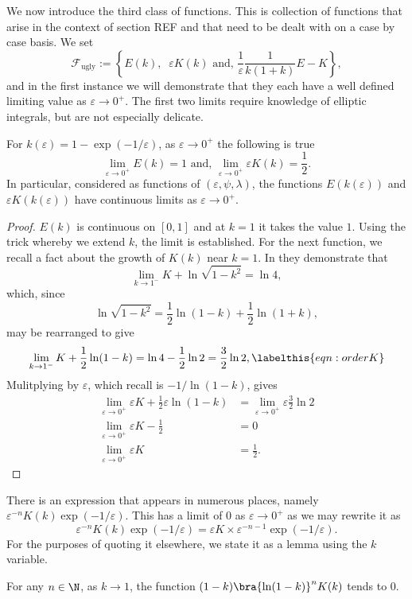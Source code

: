We now introduce the third class of functions. This is collection of functions that arise in the context of section REF  and that need to be dealt with on a case by case basis. We set
\[
\mathcal{F}_\text{ugly} := \left\{ E(k),\;\; εK(k) \text{ and, } \frac{1}{ε}\frac{1}{k(1+k)} E - K \right\},
\]
and in the first instance we will demonstrate that they each have a well defined limiting value as $ε\to 0^+$. The first two limits require knowledge of elliptic integrals, but are not especially delicate.
\begin{lem}\label{lem:limit_ugly_1}
For $k(ε) = 1 - \exp(-1/ε)$, as $ε\to 0^+$ the following is true
\[
\lim_{ε\to 0^+} E(k) = 1 \text{ and, } \lim_{ε\to 0^+} εK(k) = \frac{1}{2}.
\]
In particular, considered as functions of $(ε,ψ,λ)$, the functions $E(k(ε))$ and $εK(k(ε))$ have continuous limits as $ε \to 0^+$.

\begin{proof}
$E(k)$ is continuous on $[0,1]$ and at $k=1$ it takes the value $1$. Using the trick whereby we extend $k$, the limit is established. For the next function, we recall a fact about the growth of $K(k)$ near $k=1$. In \cite{Anderson} they demonstrate that
\[
\lim_{k \to 1^-} K + \ln\sqrt{1-k^2} = \ln 4,
\]
which, since
\[
\ln\sqrt{1-k^2} = \frac{1}{2}\ln(1-k) + \frac{1}{2}\ln(1+k),
\]
may be rearranged to give
\[
\lim_{k \to 1^-} K + \frac{1}{2}\ln(1-k) = \ln 4 - \frac{1}{2}\ln 2 = \frac{3}{2}\ln 2, \labelthis{eqn:order K}
\]
Mulitplying by $ε$, which recall is $-1/\ln(1-k)$, gives
\begin{align*}
\lim_{ε \to 0^+} εK + \frac{1}{2}ε\ln(1-k) &= \lim_{ε \to 0^+} ε\frac{3}{2}\ln 2 \\
\lim_{ε \to 0^+} εK - \frac{1}{2} &= 0 \\
\lim_{ε \to 0^+} εK &= \frac{1}{2}.
\end{align*}
\end{proof}
\end{lem}

There is an expression that appears in numerous places, namely $
ε^{-n}K(k)\exp(-1/ε)$. This has a limit of $0$ as $ε\to 0^+$ as we may rewrite it as
\[
ε^{-n}K(k)\exp(-1/ε) = εK \times ε^{-n-1}\exp(-1/ε).
\]
For the purposes of quoting it elsewhere, we state it as a lemma using the $k$ variable.
\begin{lem}\label{lem:lim(1-k)K}
For any $n\in\N$, as $k \to 1$, the function $(1-k) \bra{\ln (1-k)}^n K(k)$ tends to $0$.
\end{lem}

